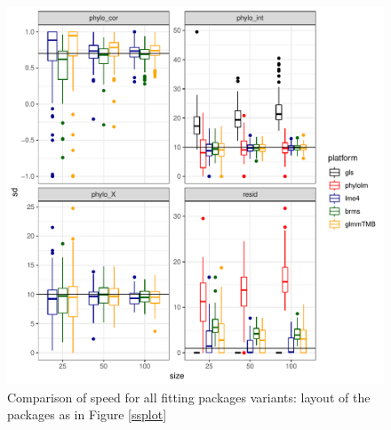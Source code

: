 \documentclass[12pt]{article}
\begin{document}
\begin{center}
\begin{figure}[H]
  \includegraphics[scale=0.8,page=2]{./git_push/plot.Rout.pdf}
  \caption{Comparison of speed for all fitting packages variants: layout of the packages as in Figure \ref{ssplot}}
\label{ssplot_speed}
\end{figure}
\end{center}
\end{document}
